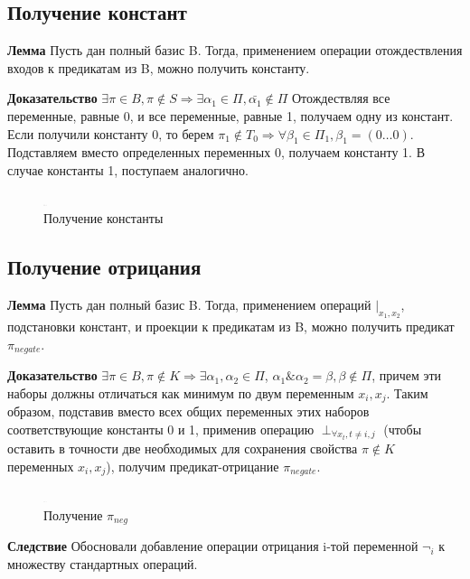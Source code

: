 \documentclass[12pt]{article}
\begin{document}
\subsection{Получение констант}
\textbf{Лемма} Пусть дан полный базис B. Тогда, применением операции отождествления входов к предикатам из B,
можно получить константу.

\textbf{Доказательство} $\exists \pi \in B, \pi \notin S \Rightarrow \exists \alpha_1 \in \Pi, \bar{\alpha_1} \notin \Pi$
Отождествляя все переменные, равные 0, и все переменные, равные 1, получаем одну из констант.
Если получили константу 0, то берем $\pi_1 \notin T_0 \Rightarrow \forall \beta_1 \in \Pi_1, \beta_1=(0 \ldots 0)$. 
Подставляем вместо определенных переменных 0, получаем константу 1. 
В случае константы 1, поступаем аналогично.
\begin{figure}[htb]
\centering
\includegraphics[width=0.01\textwidth]{3_2to3.png}
\caption{Получение константы}
\label{fig:constant}
\end{figure}

\subsection{Получение отрицания}
\textbf{Лемма}
Пусть дан полный базис B. Тогда, применением операций $|_{x_1, x_2}$, подстановки констант,
и проекции к предикатам из B, можно получить предикат $\pi_{negate}$.

\textbf{Доказательство} $\exists \pi \in B, \pi \notin K \Rightarrow \exists \alpha_1, \alpha_2 \in \Pi$,
$\alpha_1\&\alpha_2=\beta, \beta \notin \Pi$, причем эти наборы должны отличаться как минимум по двум переменным $x_i, x_{j}$.
Таким образом, подставив вместо всех общих переменных этих наборов соответствующие константы 0 и 1, применив операцию 
$\perp_{\forall x_t, t \neq i,j}$
(чтобы оставить в точности две необходимых для сохранения свойства $\pi \notin K$ переменных $x_i, x_j$), 
получим предикат-отрицание $\pi_{negate}$.
\begin{figure}[htb]
\centering
\includegraphics[width=0.01\textwidth]{3_2to3.png}
\caption{Получение $\pi_{neg}$}
\label{fig:negation}
\end{figure}

\textbf{Следствие} Обосновали добавление операции отрицания i-той переменной $\neg_i$ к множеству стандартных операций.
\end{document}
